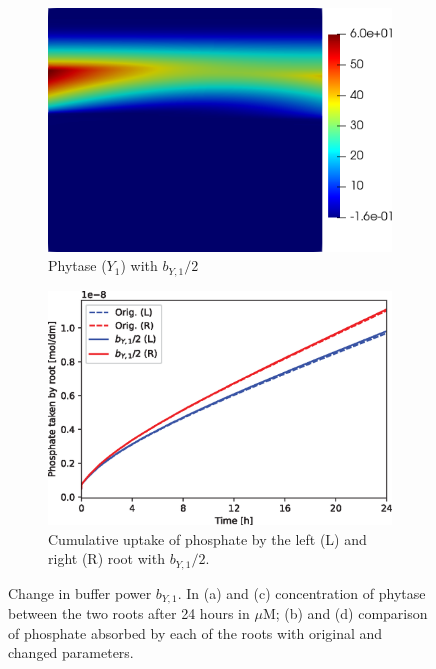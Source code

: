 \documentclass[11pt]{article}
\numberwithin{equation}{section}
\begin{document}
\begin{figure}[!htb]
\begin{subfigure}[t]{0.35\textwidth}
    \includegraphics[width=\textwidth]{Figures/Y1_bY1divby2.png}
    \caption{Phytase ($Y_1$) with $b_{Y,1} / 2$}
    \label{fig:numexp_by1down1}
\end{subfigure}
\hspace{1cm}
\begin{subfigure}[t]{0.4\textwidth}
    \includegraphics[width=\textwidth]{Figures/bY1divby2.eps}
    \caption{Cumulative uptake of phosphate by the left (L) and right (R) root with $b_{Y,1} / 2$.}
    \label{fig:numexp_by1down2}
\end{subfigure}
\caption{Change in buffer power $b_{Y,1}$. In (a) and (c) concentration of phytase between the two roots after 24 hours in $\mu$M; (b) and (d) comparison of phosphate absorbed by each of the roots with original and changed parameters.}
\end{figure}
\end{document}
